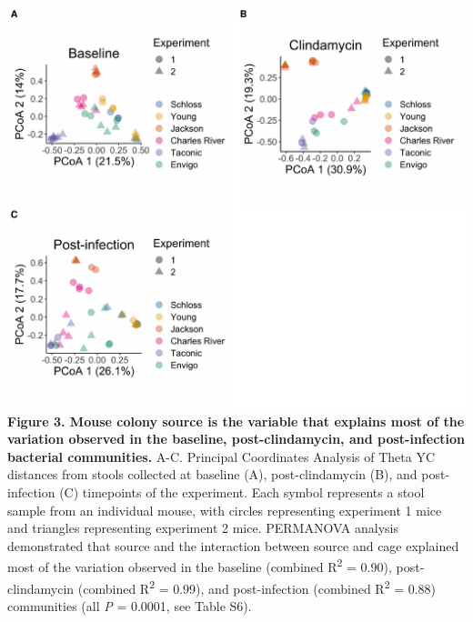 \documentclass[11pt,]{article}
\begin{document}
\newpage

\includegraphics{figure_3.pdf} \textbf{Figure 3. Mouse colony source is
the variable that explains most of the variation observed in the
baseline, post-clindamycin, and post-infection bacterial communities.}
A-C. Principal Coordinates Analysis of Theta YC distances from stools
collected at baseline (A), post-clindamycin (B), and post-infection (C)
timepoints of the experiment. Each symbol represents a stool sample from
an individual mouse, with circles representing experiment 1 mice and
triangles representing experiment 2 mice. PERMANOVA analysis
demonstrated that source and the interaction between source and cage
explained most of the variation observed in the baseline (combined
R\textsuperscript{2} = 0.90), post-clindamycin (combined
R\textsuperscript{2} = 0.99), and post-infection (combined
R\textsuperscript{2} = 0.88) communities (all \emph{P} = 0.0001, see
Table S6).

\newpage
\end{document}
